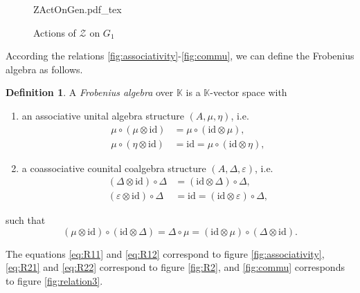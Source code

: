 \documentclass[10pt,reqno,final]{article}
\newcommand{\incfig}[1]{%
    \def\svgscale{0.38}
    {#1.pdf_tex}
}
\numberwithin{equation}{section}
\numberwithin{figure}{section}
\numberwithin{table}{section}
\theoremstyle{plain}
\theoremstyle{definition}
\newtheorem{definition}[theorem]{Definition}
\theoremstyle{remark}
\begin{document}
\begin{figure}[H]
  \centering
  \incfig{ZActOnGen}
  \caption{Actions of \(\mathcal{Z}\) on \(G_{1}\)}
  \label{fig:ZActOnGen}
\end{figure}
    According the relations \ref{fig:associativity}-\ref{fig:commu}, we can define the Frobenius algebra as follows.
    \begin{definition}\label{def:Frob-TQFT}
      A \emph{Frobenius algebra} over \(\mathbb{K}\) is a \(\mathbb{K}\)-vector space with
      \begin{enumerate}[(1)]
          \item an associative unital algebra structure \((A,\mu,\eta)\), i.e. 
          \begin{align}
            \mu\circ(\mu\otimes \mathrm{id})&=\mu\circ(\mathrm{id}\otimes \mu),\label{eq:R11}\\
            \mu\circ(\eta\otimes \mathrm{id})&= \mathrm{id}=\mu\circ(\mathrm{id}\otimes \eta)\label{eq:R21},
          \end{align}
          \item a coassociative counital coalgebra structure \((A,\Delta,\varepsilon)\), i.e.
          \begin{align}
            (\Delta\otimes \mathrm{id})\circ\Delta&=(\mathrm{id}\otimes\Delta)\circ\Delta,\label{eq:R12}\\
            (\varepsilon\otimes \mathrm{id})\circ\Delta&=\mathrm{id}=(\mathrm{id}\otimes\varepsilon)\circ\Delta,\label{eq:R22}
          \end{align}
      \end{enumerate}
      such that
      \begin{equation}\label{eq:R3}
        (\mu\otimes \mathrm{id})\circ(\mathrm{id}\otimes\Delta)=\Delta\circ\mu=(\mathrm{id}\otimes\mu)\circ(\Delta\otimes \mathrm{id}).
      \end{equation}
    \end{definition}
    
    The equations \eqref{eq:R11} and \eqref{eq:R12} correspond to figure \ref{fig:associativity}, \eqref{eq:R21} and \eqref{eq:R22} correspond to figure \ref{fig:R2}, and \eqref{fig:commu} corresponds to figure \ref{fig:relation3}.
\end{document}
